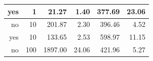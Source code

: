\documentclass[12pt,a4paper]{report}
\begin{document}
\begin{table}[H]
\begin{tabular}{|r|r|r|r|r|r|}
yes                                                                             & 1                                                                                              & 21.27                                                                                                 & 1.40                                                                                                                                & 377.69                                                                                                                                     & 23.06                                                                                                                             \\ \hline
no                                                                              & 10                                                                                             & 201.87                                                                                                & 2.30                                                                                                                                & 396.46                                                                                                                                     & 4.52                                                                                                                              \\ \hline
yes                                                                             & 10                                                                                             & 133.65                                                                                                & 2.53                                                                                                                                & 598.97                                                                                                                                     & 11.15                                                                                                                             \\ \hline
no                                                                              & 100                                                                                            & 1897.00                                                                                               & 24.06                                                                                                                               & 421.96                                                                                                                                     & 5.27                                                                                                                              \\ \hline

\end{tabular}
\end{table}
\end{document}
